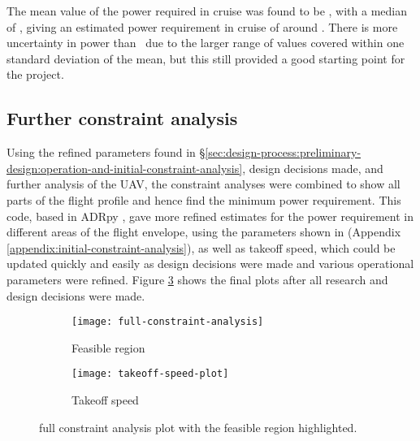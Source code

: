 \documentclass[../../main.tex]{subfiles}
\begin{document}
The mean value of the power required in cruise was found to be , with a median of , giving an estimated power requirement in cruise of around .
There is more uncertainty in power than \vcruise\, due to the larger range of values covered within one standard deviation of the mean, but this still provided a good starting point for the project.

\subsection{Further constraint analysis} \label{sec:design-process:preliminary-design:further-constraint-analysis}

Using the refined parameters found in \S \ref{sec:design-process:preliminary-design:operation-and-initial-constraint-analysis}, design decisions made, and further analysis of the UAV, the constraint analyses were combined to show all parts of the flight profile and hence find the minimum power requirement.
This code, based in ADRpy \cite{sobester}, gave more refined estimates for the power requirement in different areas of the flight envelope, using the parameters shown in (Appendix \ref{appendix:initial-constraint-analysis}), as well as takeoff speed, which could be updated quickly and easily as design decisions were made and various operational parameters were refined.
Figure \ref{fig:constraint-analysis} shows the final plots after all research and design decisions were made.


\begin{figure}[H]
    \centering
    \begin{subfigure}[b]{0.85\columnwidth}
        \centering
        \texttt{[image: full-constraint-analysis]}
        \caption{Feasible region}
        \label{fig:constraint-analysis:full}
    \end{subfigure}
    \hfill
    \begin{subfigure}[b]{0.85\columnwidth}
        \centering
        \texttt{[image: takeoff-speed-plot]}
        \caption{Takeoff speed}
        \label{fig:constraint-analysis:takeoff-speed}
    \end{subfigure}

    \caption{full constraint analysis plot with the feasible region highlighted.}
    \label{fig:constraint-analysis}
\end{figure}
\end{document}
